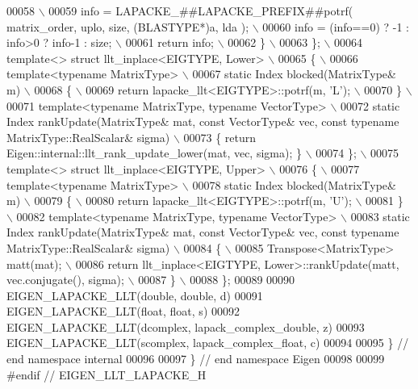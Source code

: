 \begin{DoxyCode}
00058 \textcolor{preprocessor}{\(\backslash\)}
00059 \textcolor{preprocessor}{    info = LAPACKE\_##LAPACKE\_PREFIX##potrf( matrix\_order, uplo, size, (BLASTYPE*)a, lda ); \(\backslash\)}
00060 \textcolor{preprocessor}{    info = (info==0) ? -1 : info>0 ? info-1 : size; \(\backslash\)}
00061 \textcolor{preprocessor}{    return info; \(\backslash\)}
00062 \textcolor{preprocessor}{  \} \(\backslash\)}
00063 \textcolor{preprocessor}{\}; \(\backslash\)}
00064 \textcolor{preprocessor}{template<> struct llt\_inplace<EIGTYPE, Lower> \(\backslash\)}
00065 \textcolor{preprocessor}{\{ \(\backslash\)}
00066 \textcolor{preprocessor}{  template<typename MatrixType> \(\backslash\)}
00067 \textcolor{preprocessor}{  static Index blocked(MatrixType& m) \(\backslash\)}
00068 \textcolor{preprocessor}{  \{ \(\backslash\)}
00069 \textcolor{preprocessor}{    return lapacke\_llt<EIGTYPE>::potrf(m, 'L'); \(\backslash\)}
00070 \textcolor{preprocessor}{  \} \(\backslash\)}
00071 \textcolor{preprocessor}{  template<typename MatrixType, typename VectorType> \(\backslash\)}
00072 \textcolor{preprocessor}{  static Index rankUpdate(MatrixType& mat, const VectorType& vec, const typename MatrixType::RealScalar&
       sigma) \(\backslash\)}
00073 \textcolor{preprocessor}{  \{ return Eigen::internal::llt\_rank\_update\_lower(mat, vec, sigma); \} \(\backslash\)}
00074 \textcolor{preprocessor}{\}; \(\backslash\)}
00075 \textcolor{preprocessor}{template<> struct llt\_inplace<EIGTYPE, Upper> \(\backslash\)}
00076 \textcolor{preprocessor}{\{ \(\backslash\)}
00077 \textcolor{preprocessor}{  template<typename MatrixType> \(\backslash\)}
00078 \textcolor{preprocessor}{  static Index blocked(MatrixType& m) \(\backslash\)}
00079 \textcolor{preprocessor}{  \{ \(\backslash\)}
00080 \textcolor{preprocessor}{    return lapacke\_llt<EIGTYPE>::potrf(m, 'U'); \(\backslash\)}
00081 \textcolor{preprocessor}{  \} \(\backslash\)}
00082 \textcolor{preprocessor}{  template<typename MatrixType, typename VectorType> \(\backslash\)}
00083 \textcolor{preprocessor}{  static Index rankUpdate(MatrixType& mat, const VectorType& vec, const typename MatrixType::RealScalar&
       sigma) \(\backslash\)}
00084 \textcolor{preprocessor}{  \{ \(\backslash\)}
00085 \textcolor{preprocessor}{    Transpose<MatrixType> matt(mat); \(\backslash\)}
00086 \textcolor{preprocessor}{    return llt\_inplace<EIGTYPE, Lower>::rankUpdate(matt, vec.conjugate(), sigma); \(\backslash\)}
00087 \textcolor{preprocessor}{  \} \(\backslash\)}
00088 \textcolor{preprocessor}{\};}
00089 
00090 EIGEN\_LAPACKE\_LLT(\textcolor{keywordtype}{double}, \textcolor{keywordtype}{double}, d)
00091 EIGEN\_LAPACKE\_LLT(\textcolor{keywordtype}{float}, \textcolor{keywordtype}{float}, s)
00092 EIGEN\_LAPACKE\_LLT(dcomplex, lapack\_complex\_double, z)
00093 EIGEN\_LAPACKE\_LLT(scomplex, lapack\_complex\_float, c)
00094 
00095 \} \textcolor{comment}{// end namespace internal}
00096 
00097 \} \textcolor{comment}{// end namespace Eigen}
00098 
00099 \textcolor{preprocessor}{#endif // EIGEN\_LLT\_LAPACKE\_H}
\end{DoxyCode}
